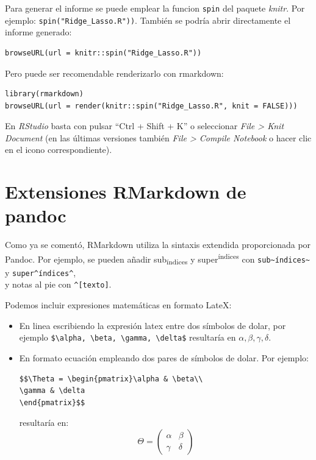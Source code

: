 \documentclass[]{book}
\theoremstyle{definition}
\theoremstyle{definition}
\theoremstyle{definition}
\theoremstyle{remark}
\begin{document}
Para generar el informe se puede emplear la funcion \texttt{spin} del
paquete \emph{knitr}. Por ejemplo: \texttt{spin("Ridge\_Lasso.R"))}.
También se podría abrir directamente el informe generado:

\begin{verbatim}
browseURL(url = knitr::spin("Ridge_Lasso.R"))
\end{verbatim}

Pero puede ser recomendable renderizarlo con rmarkdown:

\begin{verbatim}
library(rmarkdown)
browseURL(url = render(knitr::spin("Ridge_Lasso.R", knit = FALSE)))
\end{verbatim}

En \emph{RStudio} basta con pulsar ``Ctrl + Shift + K'' o seleccionar
\emph{File \textgreater{} Knit Document} (en las últimas versiones
también \emph{File \textgreater{} Compile Notebook} o hacer clic en el
icono correspondiente).

\section{Extensiones RMarkdown de
pandoc}\label{extensiones-rmarkdown-de-pandoc}

Como ya se comentó, RMarkdown utiliza la sintaxis extendida
proporcionada por Pandoc. Por ejemplo, se pueden añadir
sub\textsubscript{índices} y super\textsuperscript{índices} con
\texttt{sub\textasciitilde{}índices\textasciitilde{}} y
\texttt{super\^{}índices\^{}},\\
y notas al pie con \texttt{\^{}{[}texto{]}}.

Podemos incluir expresiones matemáticas en formato LateX:

\begin{itemize}
\item
  En linea escribiendo la expresión latex entre dos símbolos de dolar,
  por ejemplo
  \texttt{\$\textbackslash{}alpha,\ \textbackslash{}beta,\ \textbackslash{}gamma,\ \textbackslash{}delta\$}
  resultaría en \(\alpha, \beta, \gamma, \delta\).
\item
  En formato ecuación empleando dos pares de símbolos de dolar. Por
  ejemplo:

\begin{verbatim}
$$\Theta = \begin{pmatrix}\alpha & \beta\\
\gamma & \delta
\end{pmatrix}$$
\end{verbatim}

  resultaría en: \[\Theta = \begin{pmatrix}\alpha & \beta\\
  \gamma & \delta
  \end{pmatrix}\]
\end{itemize}
\end{document}
